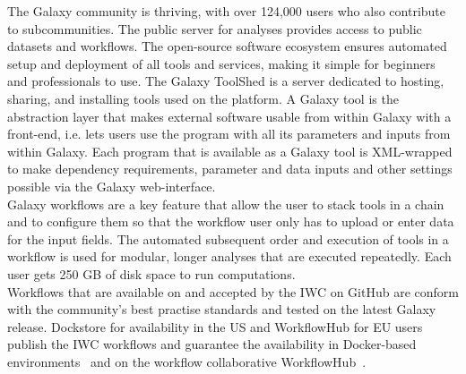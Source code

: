 The Galaxy community is thriving, with over 124,000 users who also contribute to subcommunities. The public server for analyses provides access to public datasets and workflows. The open-source software ecosystem ensures automated setup and deployment of all tools and services, making it simple for beginners and professionals to use. The Galaxy ToolShed is a server dedicated to hosting, sharing, and installing tools used on the platform. A Galaxy tool is the abstraction layer that makes external software usable from within Galaxy with a front-end, i.e. lets users use the program with all its parameters and inputs from within Galaxy. Each program that is available as a Galaxy tool is XML-wrapped to make dependency requirements, parameter and data inputs and other settings possible via the Galaxy web-interface. \\ 
Galaxy workflows are a key feature that allow the user to stack tools in a chain and to configure them so that the workflow user only has to upload or enter data for the input fields. The automated subsequent order and execution of tools in a workflow is used for modular, longer analyses that are executed repeatedly. Each user gets 250 GB of disk space to run computations. \\
Workflows that are available on and accepted by the \ac{IWC} on GitHub are conform with the community's best practise standards and tested on the latest Galaxy release. Dockstore for availability in the US and WorkflowHub for EU users publish the \ac{IWC} workflows and guarantee the availability in Docker-based environments~\cite{o2017dockstore} and on the workflow collaborative WorkflowHub~\cite{goble2021implementing}.


